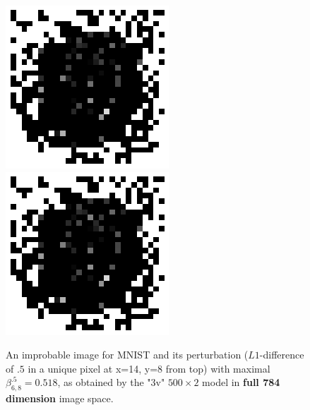 \begin{figure}[t!]
	\centering
\includegraphics[scale=0.6]{image.png} \hspace{1.5cm}
\includegraphics[scale=0.6]{perturb.png}
\caption{An improbable image for MNIST and its perturbation ($L1$-difference of $.5$ in a unique pixel at x=14, y=8 from top) with maximal $\beta^{.5}_{6,8}=0.518$, as obtained by the "3v" $500 \times 2$ model in {\bf full 784 dimension} image space.}
\label{fig3}
\end{figure}	

